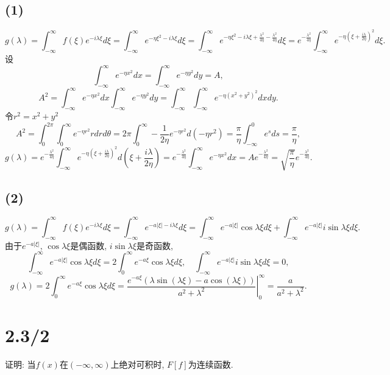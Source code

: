 \documentclass[11pt,a4paper]{article}
\begin{document}
\subsection*{(1)}
$$g(\lambda)=\int_{-\infty}^{\infty}f(\xi)e^{-i\lambda\xi}d\xi=\int_{-\infty}^{\infty}e^{-\eta\xi^2-i\lambda\xi}d\xi=\int_{-\infty}^{\infty}e^{-\eta\xi^2-i\lambda\xi+\frac{\lambda^2}{4\eta}-\frac{\lambda^2}{4\eta}}d\xi=e^{-\frac{\lambda^2}{4\eta}}\int_{-\infty}^{\infty}e^{-\eta\left(\xi+\frac{i\lambda}{2\eta}\right)^2}d\xi.$$
设$$\int_{-\infty}^\infty e^{-\eta x^2}dx=\int_{-\infty}^\infty e^{-\eta y^2}dy=A,$$
$$A^2=\int_{-\infty}^\infty e^{-\eta x^2}dx\int_{-\infty}^\infty e^{-\eta y^2}dy=\int_{-\infty}^\infty\int_{-\infty}^\infty e^{-\eta(x^2+y^2)^2}dxdy.$$
令$r^2=x^2+y^2$
$$A^2=\int_0^{2\pi}\int_0^\infty e^{-\eta r^2}rdrd\theta=2\pi\int_0^\infty-\frac{1}{2\eta}e^{-\eta r^2}d(-\eta r^2)=\frac{\pi}{\eta}\int_{-\infty}^0 e^sds=\frac{\pi}{\eta},$$
$$g(\lambda)=e^{-\frac{\lambda^2}{4\eta}}\int_{-\infty}^{\infty}e^{-\eta\left(\xi+\frac{i\lambda}{2\eta}\right)^2}d\left(\xi+\frac{i\lambda}{2\eta}\right)=e^{-\frac{\lambda^2}{4\eta}}\int_{-\infty}^{\infty}e^{-\eta x^2}dx=Ae^{-\frac{\lambda^2}{4\eta}}=\sqrt{\frac{\pi}{\eta}}e^{-\frac{\lambda^2}{4\eta}}.$$

\subsection*{(2)}
$$g(\lambda)=\int_{-\infty}^{\infty}f(\xi)e^{-i\lambda\xi}d\xi=\int_{-\infty}^{\infty}e^{-a|\xi|-i\lambda\xi}d\xi=\int_{-\infty}^{\infty}e^{-a|\xi|}\cos\lambda\xi d\xi+\int_{-\infty}^{\infty}e^{-a|\xi|}i\sin\lambda\xi d\xi.$$
由于$e^{-a|\xi|}$, $\cos\lambda\xi$是偶函数, $i\sin\lambda\xi$是奇函数,
$$\int_{-\infty}^{\infty}e^{-a|\xi|}\cos\lambda\xi d\xi=2\int_0^\infty e^{-a\xi}\cos\lambda\xi d\xi,\quad \int_{-\infty}^{\infty}e^{-a|\xi|}i\sin\lambda\xi d\xi=0,$$
$$g(\lambda)=2\int_0^\infty e^{-a\xi}\cos\lambda\xi d\xi=\left.\frac{e^{-a \xi } (\lambda  \sin (\lambda  \xi )-a \cos (\lambda  \xi ))}{a^2+\lambda ^2}\right|_0^{\infty}=\frac{a}{a^2+\lambda^2}.$$

\section{2.3/2}
\begin{problem}
证明: 当$f(x)$在$(-\infty,\infty)$上绝对可积时, $F[f]$为连续函数.
\end{problem}
\end{document}
